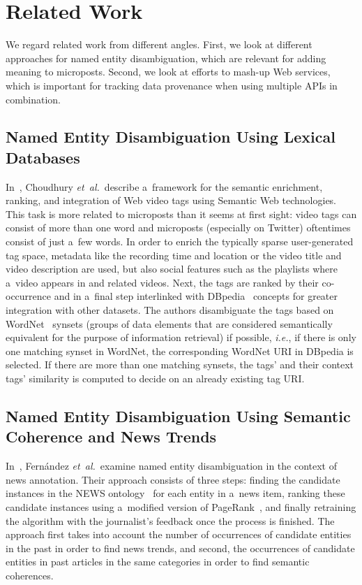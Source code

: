 \section{Related Work}

We regard related work from different angles.
First, we look at different approaches
for named entity disambiguation,
which are relevant for adding meaning to microposts.
Second, we look at efforts to mash-up Web services,
which is important for tracking data provenance
when using multiple APIs in combination.

\subsection{Named Entity Disambiguation Using Lexical Databases}

In~\cite{choudhury2009youtubetags},
Choudhury \emph{et~al.}\ describe a~framework for
the semantic enrichment, ranking, and integration
of Web video tags using Semantic Web technologies.
This task is more related to microposts
than it seems at first sight:
video tags can consist of more than one word
and microposts (especially on Twitter) oftentimes consist
of just a~few words.
In order to enrich the typically sparse
user-generated tag space,
metadata like the recording time and location
or the video title and video description are used,
but also social features such as the playlists
where a~video appears in and related videos.
Next, the tags are ranked by their co-occurrence
and in a~final step interlinked with DBpedia~\cite{auer2007dbpedia}
concepts for greater integration with other datasets.
The authors disambiguate the tags based on
WordNet~\cite{miller1995wordnet,fellbaum1998wordnet}
synsets (groups of data elements that are considered
semantically equivalent for the purpose of information retrieval)
if possible, \emph{i.e.},
if there is only one matching synset in WordNet,
the corresponding WordNet URI in DBpedia is selected.
If there are more than one matching synsets,
the tags' and their context tags' similarity is computed
to decide on an already existing tag URI.

\subsection[Named Entity Disambiguation Using Semantic Coherence]{Named Entity Disambiguation Using Semantic Coherence and News Trends}

In~\cite{fernandez2007identityrank},
Fernández \emph{et~al.}\ examine named entity disambiguation
in the context of news annotation.
Their approach consists of three steps:
finding the candidate instances in the NEWS
ontology~\cite{fernandez2010newsontology}
for each entity in a~news item,
ranking these candidate instances
using a~modified version of
PageRank~\cite{brin1998pagerank},
and finally retraining the algorithm
with the journalist's feedback once the process is finished.
The approach first takes into account the number
of occurrences of candidate entities in the past
in order to find news trends,
and second, the occurrences of candidate entities
in past articles in the same categories
in order to find semantic coherences.

